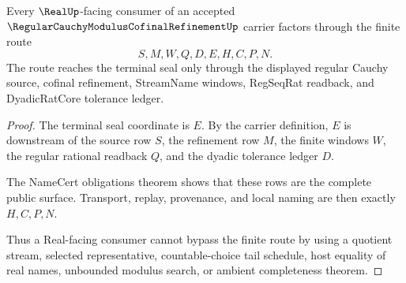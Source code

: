 \begin{theorem}
\label{thm:regular-cauchy-modulus-cofinal-refinement-real-handoff}
Every $\RealUp$-facing consumer of an accepted $\RegularCauchyModulusCofinalRefinementUp$ carrier factors through the finite route
$$
S,M,W,Q,D,E,H,C,P,N .
$$
The route reaches the terminal seal only through the displayed regular Cauchy source, cofinal refinement, StreamName windows, RegSeqRat readback, and DyadicRatCore tolerance ledger.
\end{theorem}
\begin{proof}
The terminal seal coordinate is $E$. By the carrier definition, $E$ is downstream of the source row $S$, the refinement row $M$, the finite windows $W$, the regular rational readback $Q$, and the dyadic tolerance ledger $D$.

The NameCert obligations theorem shows that these rows are the complete public surface. Transport, replay, provenance, and local naming are then exactly $H,C,P,N$.

Thus a Real-facing consumer cannot bypass the finite route by using a quotient stream, selected representative, countable-choice tail schedule, host equality of real names, unbounded modulus search, or ambient completeness theorem.
\end{proof}




